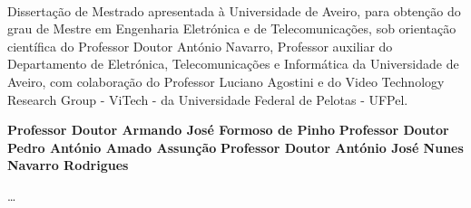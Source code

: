 \TitlePage

  \HEADER{\BAR}
         {\ThesisYear}
  \TITLE{\myName}
        {\TituloTese}
        {\ThesisTitle}
\EndTitlePage
\titlepage\ \endtitlepage %


%
%

\TitlePage
  \HEADER{}{\ThesisYear}
  \TITLE{\myName}
        {\TituloTese}
        {\ThesisTitle}
  \vskip 15mm
  \TEXT{}
       {Dissertação de Mestrado apresentada à Universidade de Aveiro, para obtenção do grau de Mestre em Engenharia Eletrónica e de Telecomunicações, sob orientação científica do Professor Doutor António Navarro, Professor auxiliar do Departamento de Eletrónica, Telecomunicações e Informática da  Universidade de Aveiro, com colaboração do Professor Luciano Agostini e do Video Technology Research Group - ViTech - da Universidade Federal de Pelotas - UFPel.}
\EndTitlePage
\titlepage\ \endtitlepage %

\TitlePage
  \vspace*{55mm}
       {}
       {\textbf{Professor Doutor Armando José Formoso de Pinho
       }}
  \vspace*{5mm}
       {\textbf{Professor Doutor Pedro António Amado Assunção}}
  \vspace*{5mm}
  \TEXT{}
       {\textbf{Professor Doutor António José Nunes Navarro Rodrigues}}
\EndTitlePage
\titlepage\ \endtitlepage %

\TitlePage
  \vspace*{55mm}
       {\ldots}
  \TEXT{}
       {}
\EndTitlePage
\titlepage\ \endtitlepage %


